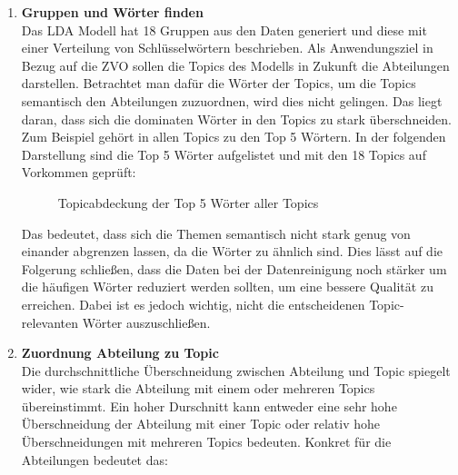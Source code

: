 \documentclass[german,version-2020-11]{uzl-thesis}
\begin{document}
\begin{enumerate}
\item \textbf{Gruppen und Wörter finden}\\
Das LDA Modell hat 18 Gruppen aus den Daten generiert und diese mit einer Verteilung von Schlüsselwörtern beschrieben. Als Anwendungsziel in Bezug auf die ZVO sollen die Topics des Modells in Zukunft die Abteilungen darstellen. Betrachtet man dafür die Wörter der Topics, um die Topics semantisch den Abteilungen zuzuordnen, wird dies nicht gelingen. Das liegt daran, dass sich die dominaten Wörter in den Topics zu stark überschneiden. Zum Beispiel gehört  in allen Topics zu den Top 5 Wörtern. In der folgenden Darstellung sind die Top 5 Wörter aufgelistet und mit den 18 Topics auf Vorkommen geprüft: 

\begin{figure}[H]
\begin{center}
\caption{Topicabdeckung der Top 5 Wörter aller Topics}
\end{center}
\end{figure}

Das bedeutet, dass sich die Themen semantisch nicht stark genug von einander abgrenzen lassen, da die Wörter zu ähnlich sind. Dies lässt auf die Folgerung schließen, dass die Daten bei der Datenreinigung noch stärker um die  häufigen Wörter reduziert werden sollten, um eine bessere Qualität zu erreichen. Dabei ist es jedoch wichtig, nicht die entscheidenen Topic-relevanten Wörter auszuschließen.
\\
\item \textbf{Zuordnung Abteilung zu Topic}\\
Die durchschnittliche Überschneidung zwischen Abteilung und Topic spiegelt wider, wie stark die Abteilung mit einem oder mehreren Topics übereinstimmt. Ein hoher Durschnitt kann entweder eine sehr hohe Überschneidung der Abteilung mit einer Topic oder relativ hohe Überschneidungen mit mehreren Topics bedeuten. Konkret für die Abteilungen bedeutet das: 
\end{enumerate}
\end{document}
